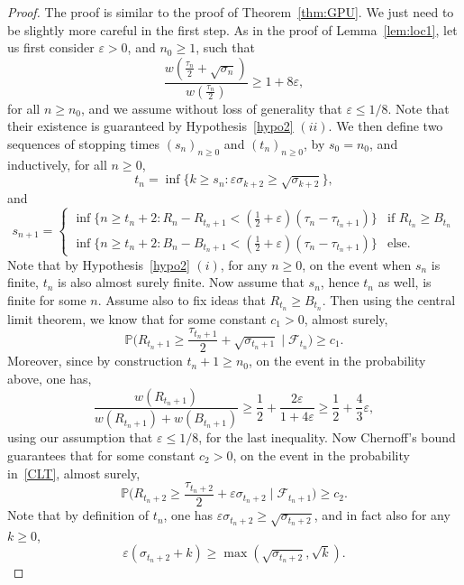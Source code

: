 \documentclass[11pt]{article}
\newcommand{\1}{{\text{\Large $\mathfrak 1$}}}
\begin{document}
\begin{proof}
The proof is similar to the proof of Theorem~\ref{thm:GPU}. We just need to be slightly more careful in the first step. As in the proof of Lemma~\ref{lem:loc1}, let us first 
consider $\varepsilon>0$, and $n_0\ge 1$, such that 
$$\frac{w( \frac{\tau_n}{2} + \sqrt{\sigma_n})}{w(\frac{\tau_n}{2})} \ge 1+ 8 \varepsilon, $$
for all $n\ge n_0$, and we assume without loss of generality that $\varepsilon\le 1/8$. Note that their existence is guaranteed by Hypothesis~\ref{hypo2} $(ii)$.  We then define two sequences of stopping times $(s_n)_{n\ge 0}$ and 
$(t_n)_{n\ge 0}$, by $s_0 = n_0$, and inductively, for all $n\ge 0$, 
$$t_n = \inf \{ k \ge s_n : \varepsilon\sigma_{k+2} \ge \sqrt{\sigma_{k+2}}\}, $$
and 
\begin{equation*}
s_{n+1} = \left\{ 
\begin{array}{ll} 
\inf \{n \ge t_n +2: R_n - R_{t_n+1} <(\frac 12 + \varepsilon)(\tau_n- \tau_{t_n+1}) \} & \text{if }R_{t_n} \ge B_{t_n} \\
\inf \{n \ge t_n +2: B_n - B_{t_n+1} <(\frac 12 + \varepsilon)(\tau_n- \tau_{t_n+1})\} & \text{else}. 
\end{array}
\right. 
\end{equation*}
Note that by Hypothesis~\ref{hypo2} $(i)$, for any $n\ge 0$, on the event when $s_n$ is finite, $t_n$ is also almost surely finite. 
Now assume that $s_n$, hence $t_n$ as well, is finite for some $n$. Assume also to fix ideas that $R_{t_n} \ge B_{t_n}$. Then using the central limit theorem, we know that for some constant $c_1>0$, almost surely, 
\begin{equation}\label{CLT}
\mathbb P\big(R_{t_n +1} \ge \frac{\tau_{t_n+1}}{2} + \sqrt{\sigma_{t_n +1}} \mid \mathcal F_{t_n}\big)\ge c_1. 
\end{equation}
Moreover, since by construction $t_n+1\ge n_0$, on the event in the probability above, one has, 
$$\frac{w(R_{t_n+1})}{w(R_{t_n+1}) + w(B_{t_n+1})} \ge \frac 12 + \frac{2 \varepsilon}{1+ 4\varepsilon}\ge \frac 12 + \frac 43 \varepsilon,$$
using our assumption that $\varepsilon\le 1/8$, for the last inequality. Now Chernoff's bound guarantees that for some constant $c_2>0$, on the event in the probability in~\eqref{CLT}, almost surely, 
$$ \mathbb P\big(R_{t_n +2} \ge \frac{\tau_{t_n+2}}{2} + \varepsilon \sigma_{t_n+2}  \mid \mathcal F_{t_n+1}\big)\ge c_2.$$  
Note that by definition of $t_n$, one has $\varepsilon \sigma_{t_n+2} \ge \sqrt{\sigma_{t_n+2}}$, and in fact also for any $k\ge 0$, 
$$\varepsilon (\sigma_{t_n+2} + k) \ge \max(\sqrt{\sigma_{t_n+2}},\sqrt{k}). $$  

\end{proof}
\end{document}
